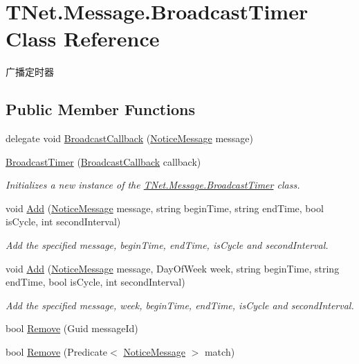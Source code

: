 \hypertarget{class_t_net_1_1_message_1_1_broadcast_timer}{}\section{T\+Net.\+Message.\+Broadcast\+Timer Class Reference}
\label{class_t_net_1_1_message_1_1_broadcast_timer}


广播定时器  


\subsection*{Public Member Functions}
\begin{DoxyCompactItemize}
\item 
delegate void \mbox{\hyperlink{class_t_net_1_1_message_1_1_broadcast_timer_a1448fe69d16ce4a9e2b202e1d82fd944}{Broadcast\+Callback}} (\mbox{\hyperlink{class_t_net_1_1_message_1_1_notice_message}{Notice\+Message}} message)
\item 
\mbox{\hyperlink{class_t_net_1_1_message_1_1_broadcast_timer_abcf0ff0d54000d1286590c1aed0efe15}{Broadcast\+Timer}} (\mbox{\hyperlink{class_t_net_1_1_message_1_1_broadcast_timer_a1448fe69d16ce4a9e2b202e1d82fd944}{Broadcast\+Callback}} callback)
\begin{DoxyCompactList}\small\item\em Initializes a new instance of the \mbox{\hyperlink{class_t_net_1_1_message_1_1_broadcast_timer}{T\+Net.\+Message.\+Broadcast\+Timer}} class. \end{DoxyCompactList}\item 
void \mbox{\hyperlink{class_t_net_1_1_message_1_1_broadcast_timer_a6903709845c4dc7a6d5b8c325f50e993}{Add}} (\mbox{\hyperlink{class_t_net_1_1_message_1_1_notice_message}{Notice\+Message}} message, string begin\+Time, string end\+Time, bool is\+Cycle, int second\+Interval)
\begin{DoxyCompactList}\small\item\em Add the specified message, begin\+Time, end\+Time, is\+Cycle and second\+Interval. \end{DoxyCompactList}\item 
void \mbox{\hyperlink{class_t_net_1_1_message_1_1_broadcast_timer_ae3e883e10fa7270176e4d4bdd00c0cc4}{Add}} (\mbox{\hyperlink{class_t_net_1_1_message_1_1_notice_message}{Notice\+Message}} message, Day\+Of\+Week week, string begin\+Time, string end\+Time, bool is\+Cycle, int second\+Interval)
\begin{DoxyCompactList}\small\item\em Add the specified message, week, begin\+Time, end\+Time, is\+Cycle and second\+Interval. \end{DoxyCompactList}\item 
bool \mbox{\hyperlink{class_t_net_1_1_message_1_1_broadcast_timer_ae158ae35265a5bc4d3047c2410cc6571}{Remove}} (Guid message\+Id)
\item 
bool \mbox{\hyperlink{class_t_net_1_1_message_1_1_broadcast_timer_a2bf88ef8fa26ae3e0b03c90806c8fc19}{Remove}} (Predicate$<$ \mbox{\hyperlink{class_t_net_1_1_message_1_1_notice_message}{Notice\+Message}} $>$ match)
\end{DoxyCompactItemize}


